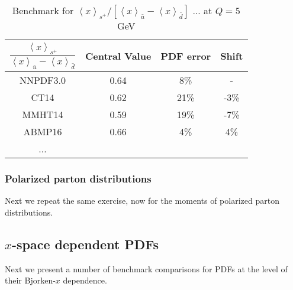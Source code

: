 \begin{table}[t]
\centering
\begin{tabular}{|c||c|c|c|}
\hline 
\rule[-3 ex]{0pt}{7 ex}  %
$\dfrac{\left\langle x\right\rangle _{s^{+}}}{\left\langle x\right\rangle _{\bar{u}}-\left\langle x\right\rangle _{\bar{d}}}$ 
   & Central Value & PDF error & Shift\\
\hline 
\hline 
NNPDF3.0 & 0.64 & 8\% & -\\
\hline 
CT14 & 0.62 & 21\% & -3\%\\
\hline 
MMHT14 & 0.59 & 19\% & -7\%\\
\hline 
ABMP16 & 0.66 & 4\% & 4\%\\
\hline 
... &  &  & \\
\hline 
\end{tabular}

\caption{Benchmark for $\left\langle x\right\rangle _{s^{+}}/\left[\left\langle x\right\rangle _{\bar{u}}-\left\langle x\right\rangle _{\bar{d}}\right]$
... at $Q=5$ GeV}
\end{table}



\subsubsection{Polarized parton distributions}

Next we repeat the same exercise, now for the moments
of polarized parton distributions.

\subsection{$x$-space dependent PDFs}

Next we present a number of benchmark comparisons for
PDFs at the level of their Bjorken-$x$
dependence.
